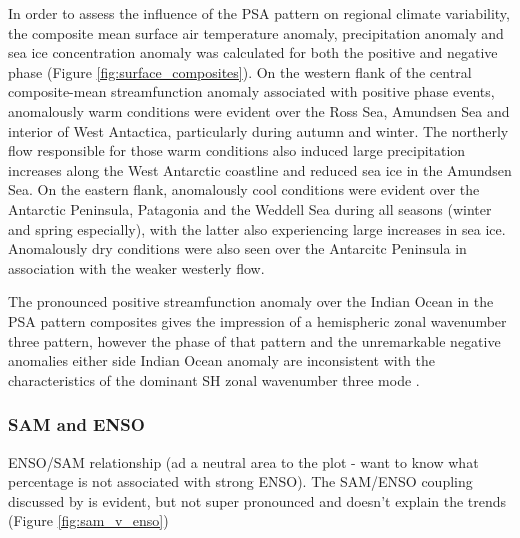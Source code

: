 In order to assess the influence of the PSA pattern on regional climate variability, the composite mean surface air temperature anomaly, precipitation anomaly and sea ice concentration anomaly was calculated for both the positive and negative phase (Figure \ref{fig:surface_composites}). On the western flank of the central composite-mean streamfunction anomaly associated with positive phase events, anomalously warm conditions were evident over the Ross Sea, Amundsen Sea and interior of West Antactica, particularly during autumn and winter. The northerly flow responsible for those warm conditions also induced large precipitation increases along the West Antarctic coastline and reduced sea ice in the Amundsen Sea. On the eastern flank, anomalously cool conditions were evident over the Antarctic Peninsula, Patagonia and the Weddell Sea during all seasons (winter and spring especially), with the latter also experiencing large increases in sea ice. Anomalously dry conditions were also seen over the Antarcitc Peninsula in association with the weaker westerly flow. 

The pronounced positive streamfunction anomaly over the Indian Ocean in the PSA pattern composites gives the impression of a hemispheric zonal wavenumber three pattern, however the phase of that pattern and the unremarkable negative anomalies either side Indian Ocean anomaly are inconsistent with the characteristics of the dominant SH zonal wavenumber three mode \citep[e.g.][]{Raphael2004,IrvingSimmonds2015}.

\subsubsection{SAM and ENSO}

ENSO/SAM relationship (ad a neutral area to the plot - want to know what percentage is not associated with strong ENSO). The SAM/ENSO coupling discussed by \citet{Fogt2006} is evident, but not super pronounced and doesn't explain the trends (Figure \ref{fig:sam_v_enso})



